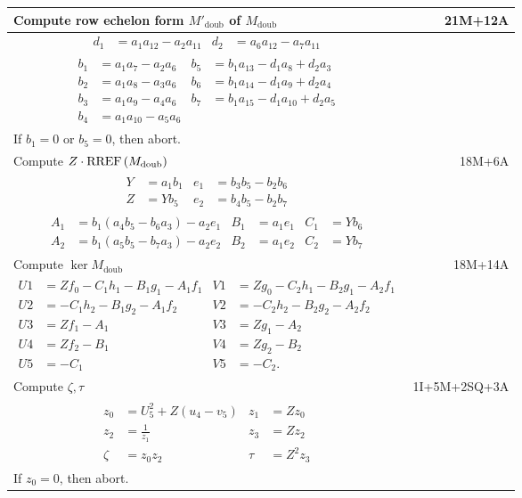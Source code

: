 \pagebreak
\begin{tabularx}{\linewidth}{|Xr|}
  \hline
  Compute row echelon form $M'_{\text{doub}}$ of $M_{\text{doub}}$ & 21M+12A \\
  \hline
  {\begin{align*}
    d_1 &= a_1a_{12} - a_2a_{11} & d_2 &= a_6a_{12} - a_7a_{11} 
  \end{align*}} & \\
  {\begin{align*}
    b_1 &= a_1a_7    - a_2a_6 & b_5 &= b_1a_{13} - d_1a_8    + d_2a_3 \\
    b_2 &= a_1a_8    - a_3a_6 & b_6 &= b_1a_{14} - d_1a_9    + d_2a_4 \\
    b_3 &= a_1a_9    - a_4a_6 & b_7 &= b_1a_{15} - d_1a_{10} + d_2a_5 \\
    b_4 &= a_1a_{10} - a_5a_6
  \end{align*}} & \\
  If $b_1 =0$ or $b_5 = 0$, then abort. & \\
  \hline
  Compute $Z \cdot \operatorname{RREF}\left(M_{\text{doub}}\right)$ & 18M+6A \\
  \hline
  {\begin{align*}
    Y &= a_1b_1 & e_1 &= b_3b_5 - b_2b_6 \\
    Z &= Yb_5   & e_2 &= b_4b_5 - b_2b_7
  \end{align*}} & \\
  {\begin{align*}
    A_1 &= b_1(a_4b_5 - b_6a_3) - a_2e_1 & B_1 &= a_1e_1 & C_1 &= Yb_6 \\
    A_2 &= b_1(a_5b_5 - b_7a_3) - a_2e_2 & B_2 &= a_1e_2 & C_2 &= Yb_7
  \end{align*}} & \\
  \hline
    Compute $\ker M_{\text{doub}}$ & 18M+14A \\
  \hline
  {\begin{align*}
    U1 &= Zf_0 - C_1h_1 - B_1g_1 - A_1f_1 & V1 &= Zg_0 - C_2h_1 - B_2g_1 - A_2f_1 \\
    U2 &=      - C_1h_2 - B_1g_2 - A_1f_2 & V2 &=      - C_2h_2 - B_2g_2 - A_2f_2 \\
    U3 &= Zf_1 - A_1 & V3 &= Zg_1 - A_2 \\
    U4 &= Zf_2 - B_1 & V4 &= Zg_2 - B_2 \\
    U5 &=      - C_1 & V5 &=      - C_2.
  \end{align*}} & \\
  \hline
    Compute $\zeta, \tau$ & 1I+5M+2SQ+3A \\
  \hline
  {\begin{align*}
    z_0 &= U_5^2 + Z(u_4 - v_5) & z_1 &= Zz_0 \\
    z_2 &= \frac 1 {z_1} & z_3 &= Zz_2 \\
    \zeta &= z_0z_2 & \tau  &= Z^2z_3
  \end{align*}} & \\
  If $z_0 = 0$, then abort. & \\
  \hline
\end{tabularx}

